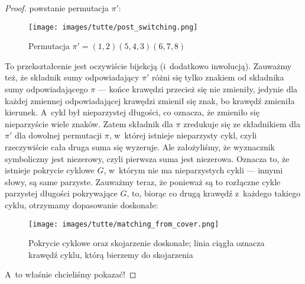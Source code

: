 \begin{proof}
        powstanie permutacja $\pi'$:
        
        \begin{figure}[H]
            \centering
            \texttt{[image: images/tutte/post\_switching.png]}
            \caption{Permutacja $\pi' = (1, 2)(5, 4, 3)(6, 7, 8)$}
        \end{figure}
        
        To przekształcenie jest oczywiście bijekcją (i~dodatkowo inwolucją). Zauważmy też, że składnik sumy odpowiadający $\pi'$ różni się tylko znakiem od składnika sumy odpowiadającego $\pi$ --- końce krawędzi przecież się nie zmieniły, jedynie dla każdej zmiennej odpowiadającej krawędzi zmienił się znak, bo krawędź zmieniła kierunek. A~cykl był nieparzystej długości, co oznacza, że zmieniło się nieparzyście wiele znaków. Zatem składnik dla $\pi$ zredukuje się ze składnikiem dla $\pi'$ dla dowolnej permutacji $\pi$, w~której istnieje nieparzysty cykl, czyli rzeczywiście cała druga suma się wyzeruje. Ale założyliśmy, że wyznacznik symboliczny jest niezerowy, czyli pierwsza suma jest niezerowa. Oznacza to, że istnieje pokrycie cyklowe $G$, w~którym nie ma nieparzystych cykli --- innymi słowy, są same parzyste. Zauważmy teraz, że ponieważ są to rozłączne cykle parzystej długości pokrywające $G$, to, biorąc co drugą krawędź z~każdego takiego cyklu, otrzymamy dopasowanie doskonałe:
        
        \begin{figure}[H]
            \centering
            \texttt{[image: images/tutte/matching\_from\_cover.png]}
            \caption{Pokrycie cyklowe oraz skojarzenie doskonałe; linia ciągła oznacza krawędź cyklu, którą bierzemy do skojarzenia }
        \end{figure}
        
        A~to właśnie chcieliśmy pokazać!
    \end{proof}